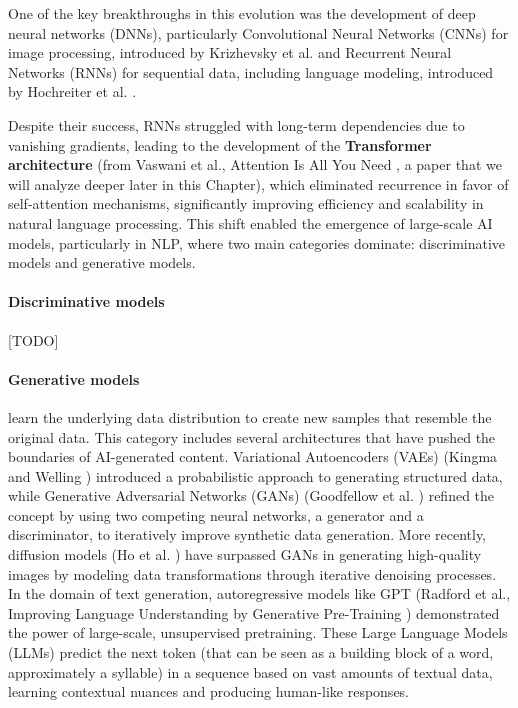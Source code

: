 One of the key breakthroughs in this evolution was the development of deep neural
networks (DNNs), particularly Convolutional Neural Networks (CNNs) for image
processing, introduced by Krizhevsky et al. \cite{articleCNN} and Recurrent
Neural Networks (RNNs) for sequential data, including language modeling,
introduced by Hochreiter et al. \cite{articleRNN}.

Despite their success, RNNs struggled with long-term dependencies due to
vanishing gradients, leading to the development of the \textbf{Transformer
architecture} (from Vaswani et al., Attention Is All You Need \cite{vaswani2023attentionneed},
a paper that we will analyze deeper later in this Chapter), which eliminated
recurrence in favor of self-attention mechanisms, significantly improving efficiency
and scalability in natural language processing. This shift enabled the emergence
of large-scale AI models, particularly in NLP, where two main categories
dominate: discriminative models and generative models.

\paragraph{Discriminative models}
[TODO]

\paragraph{Generative models}
learn the underlying data distribution to create new samples that resemble the
original data. This category includes several architectures that have pushed the
boundaries of AI-generated content. Variational Autoencoders (VAEs) (Kingma and Welling
\cite{kingma2022autoencodingvariationalbayes}) introduced a probabilistic
approach to generating structured data, while Generative Adversarial Networks (GANs)
(Goodfellow et al. \cite{goodfellow2014generativeadversarialnetworks}) refined
the concept by using two competing neural networks, a generator and a discriminator,
to iteratively improve synthetic data generation. More recently, diffusion
models (Ho et al. \cite{ho2020denoisingdiffusionprobabilisticmodels}) have surpassed
GANs in generating high-quality images by modeling data transformations through iterative
denoising processes. In the domain of text generation, autoregressive models like
GPT (Radford et al., Improving Language Understanding by Generative Pre-Training
\cite{radford2018improving}) demonstrated the power of large-scale, unsupervised
pretraining. These Large Language Models (LLMs) predict the next token (that can
be seen as a building block of a word, approximately a syllable) in a sequence
based on vast amounts of textual data, learning contextual nuances and producing
human-like responses.


